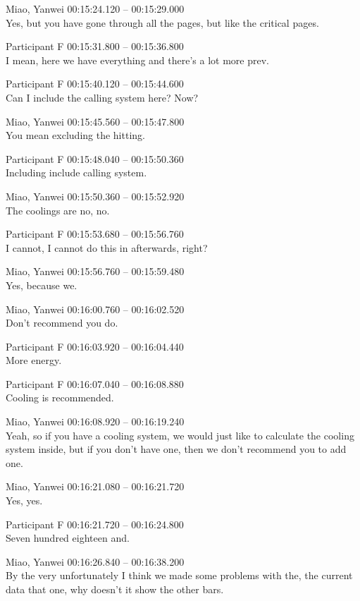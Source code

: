 {Miao, Yanwei 00:15:24.120 -- 00:15:29.000 \\
Yes, but you have gone through all the pages, but like the critical pages.

Participant F 00:15:31.800 -- 00:15:36.800 \\
I mean, here we have everything and there's a lot more prev.

Participant F 00:15:40.120 -- 00:15:44.600 \\
Can I include the calling system here? Now?

Miao, Yanwei 00:15:45.560 -- 00:15:47.800 \\
You mean excluding the hitting.

Participant F 00:15:48.040 -- 00:15:50.360 \\
Including include calling system.

Miao, Yanwei 00:15:50.360 -- 00:15:52.920 \\
The coolings are no, no.

Participant F 00:15:53.680 -- 00:15:56.760 \\
I cannot, I cannot do this in afterwards, right?

Miao, Yanwei 00:15:56.760 -- 00:15:59.480 \\
Yes, because we.

Miao, Yanwei 00:16:00.760 -- 00:16:02.520 \\
Don't recommend you do.

Participant F 00:16:03.920 -- 00:16:04.440 \\
More energy.

Participant F 00:16:07.040 -- 00:16:08.880 \\
Cooling is recommended.

Miao, Yanwei 00:16:08.920 -- 00:16:19.240 \\
Yeah, so if you have a cooling system, we would just like to calculate the cooling system inside, but if you don't have one, then we don't recommend you to add one.

Miao, Yanwei 00:16:21.080 -- 00:16:21.720 \\
Yes, yes.

Participant F 00:16:21.720 -- 00:16:24.800 \\
Seven hundred eighteen and.

Miao, Yanwei 00:16:26.840 -- 00:16:38.200 \\
By the very unfortunately I think we made some problems with the, the current data that one, why doesn't it show the other bars.

}
